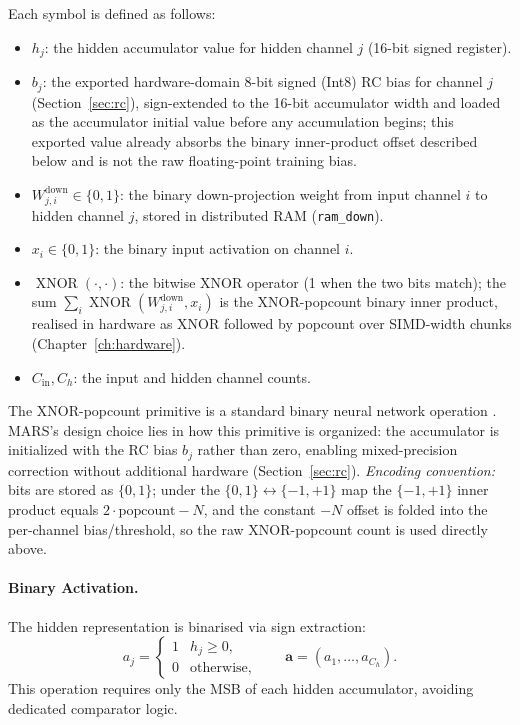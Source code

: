 \documentclass[12pt, a4paper]{report}
\numberwithin{equation}{chapter}
\numberwithin{figure}{chapter}
\numberwithin{table}{chapter}
\numberwithin{algorithm}{chapter}
\begin{document}
Each symbol is defined as follows:
\begin{itemize}
    \item $h_j$: the hidden accumulator value for hidden channel $j$ (16-bit signed register).
    \item $b_j$: the exported hardware-domain 8-bit signed (Int8) RC bias for channel $j$ (Section~\ref{sec:rc}), sign-extended to the 16-bit accumulator width and loaded as the accumulator initial value before any accumulation begins; this exported value already absorbs the binary inner-product offset described below and is not the raw floating-point training bias.
    \item $W^{\text{down}}_{j,i} \in \{0,1\}$: the binary down-projection weight from input channel $i$ to hidden channel $j$, stored in distributed RAM (\texttt{ram\_down}).
    \item $x_i \in \{0,1\}$: the binary input activation on channel $i$.
    \item $\operatorname{XNOR}(\cdot,\cdot)$: the bitwise XNOR operator (1 when the two bits match); the sum $\sum_i \operatorname{XNOR}(W^{\text{down}}_{j,i}, x_i)$ is the XNOR-popcount binary inner product, realised in hardware as XNOR followed by popcount over SIMD-width chunks (Chapter~\ref{ch:hardware}).
    \item $C_{\text{in}}, C_h$: the input and hidden channel counts.
\end{itemize}

The XNOR-popcount primitive is a standard binary neural network operation \cite{Rastegari2016XNOR, Hubara2016BinarizedNN}. MARS's design choice lies in how this primitive is organized: the accumulator is initialized with the RC bias $b_j$ rather than zero, enabling mixed-precision correction without additional hardware (Section~\ref{sec:rc}). \emph{Encoding convention:} bits are stored as $\{0,1\}$; under the $\{0,1\}\!\leftrightarrow\!\{-1,+1\}$ map the $\{-1,+1\}$ inner product equals $2\cdot\text{popcount}-N$, and the constant $-N$ offset is folded into the per-channel bias/threshold, so the raw XNOR-popcount count is used directly above.

\paragraph{Binary Activation.} The hidden representation is binarised via sign extraction:
\begin{equation}
a_j = \begin{cases} 1 & h_j \geq 0, \\ 0 & \text{otherwise,} \end{cases} \qquad \mathbf{a} = (a_1, \ldots, a_{C_h}).
\label{eq:binary_act}
\end{equation}
This operation requires only the MSB of each hidden accumulator, avoiding dedicated comparator logic.
\end{document}
